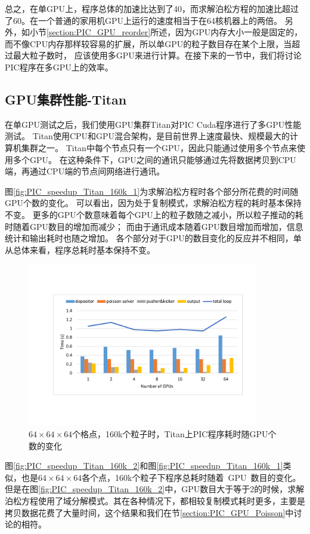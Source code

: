 总之，在单GPU上，程序总体的加速比达到了40，而求解泊松方程的加速比超过了60。在一个普通的家用机GPU上运行的速度相当于在64核机器上的两倍。
另外，如小节\eqref{section:PIC_GPU_reorder}所述，因为GPU内存大小一般是固定的，
而不像CPU内存那样较容易的扩展，所以单GPU的粒子数目存在某个上限，当超过最大粒子数时，
应该使用多GPU来进行计算。在接下来的一节中，我们将讨论PIC程序在多GPU上的效率。

\subsection{GPU集群性能-Titan}
在单GPU测试之后，我们使用GPU集群Titan对PIC Cuda程序进行了多GPU性能测试。
Titan使用CPU和GPU混合架构，是目前世界上速度最快、规模最大的计算机集群之一。
Titan中每个节点只有一个GPU，因此只能通过使用多个节点来使用多个GPU。
在这种条件下，GPU之间的通讯只能够通过先将数据拷贝到CPU端，再通过CPU端的节点间网络进行通讯。

图\eqref{fig:PIC_speedup_Titan_160k_1}为求解泊松方程时各个部分所花费的时间随GPU个数的变化。
可以看出，因为处于复制模式，求解泊松方程的耗时基本保持不变。
更多的GPU个数意味着每个GPU上的粒子数随之减小，所以粒子推动的耗时随着GPU数目的增加而减少；
而由于通讯成本随着GPU数目增加而增加，信息统计和输出耗时也随之增加。
各个部分对于GPU的数目变化的反应并不相同，单从总体来看，程序总耗时基本保持不变。

\begin{figure}[!htb]
  \centering
  \includegraphics[width=0.9\textwidth]{Img/PIC_speedup_Titan_160k_1.pdf}
  \caption{$64 \times 64 \times 64$个格点，160k个粒子时，Titan上PIC程序耗时随GPU个数的变化}
  \label{fig:PIC_speedup_Titan_160k_1}
\end{figure}

图\eqref{fig:PIC_speedup_Titan_160k_2}和图\eqref{fig:PIC_speedup_Titan_160k_1}类似，也是$64 \times 64 \times 64$各个点，160k个粒子下程序总耗时随着~GPU~数目的变化。
但是在图\eqref{fig:PIC_speedup_Titan_160k_2}中，GPU数目大于等于2的时候，求解泊松方程使用了域分解模式。其在各种情况下，都相较复制模式耗时更多，主要是拷贝数据花费了大量时间，这个结果和我们在节\eqref{section:PIC_GPU_Poisson}中讨论的相符。

